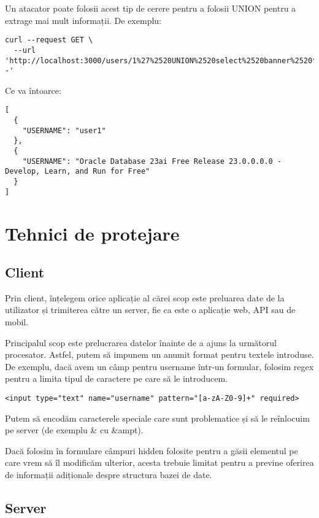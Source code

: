 \documentclass[12pt, a4paper]{report}
\begin{document}
Un atacator poate folosii acest tip de cerere pentru a folosii UNION pentru a
extrage mai mult informații. De exemplu:

\label{exemplush1}
\lstset{language=bash}
\begin{lstlisting}
curl --request GET \
  --url 'http://localhost:3000/users/1%27%2520UNION%2520select%2520banner%2520from%2520v$version%2520--'
\end{lstlisting}

Ce va întoarce:

\begin{lstlisting}
[
  {
    "USERNAME": "user1"
  },
  {
    "USERNAME": "Oracle Database 23ai Free Release 23.0.0.0.0 - Develop, Learn, and Run for Free"
  }
]
\end{lstlisting}

\section{Tehnici de protejare}
\subsection{Client}

Prin client, înțelegem orice aplicație al cărei scop este preluarea date de la 
utilizator și trimiterea către un server, fie ca este o aplicație web, API sau 
de mobil.

Principalul scop este prelucrarea datelor înainte de a ajuns la următorul procesator.
Astfel, putem să impunem un anumit format pentru textele introduse. De exemplu, dacă
avem un câmp pentru username într-un formular, folosim regex pentru a limita tipul de caractere pe care să le introducem.


\lstset{language=html}
\begin{lstlisting}
<input type="text" name="username" pattern="[a-zA-Z0-9]+" required>
\end{lstlisting}

Putem să encodăm caracterele speciale care sunt problematice și să le reînlocuim pe server (de exemplu \& cu \&ampt).

Dacă folosim în formulare câmpuri hidden folosite pentru a găsii elementul
pe care vrem să îl modificăm ulterior, acesta trebuie limitat pentru a previne oferirea 
de informații adiționale despre structura bazei de date.

\subsection{Server}
\end{document}
